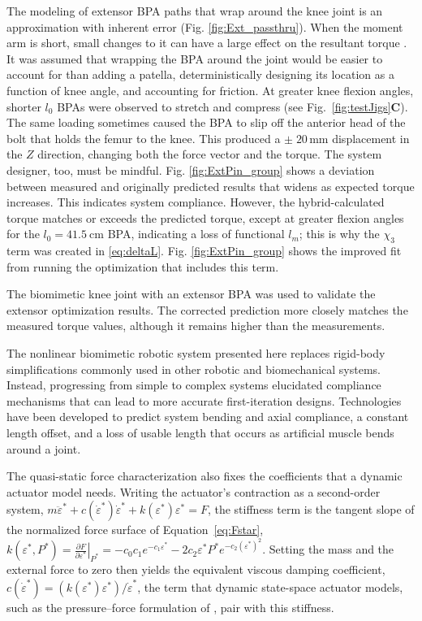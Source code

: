 The modeling of extensor BPA paths that wrap around the knee joint is an approximation with inherent error (Fig. \ref{fig:Ext_passthru}). When the moment arm is short, small changes to it can have a large effect on the resultant torque \citep{young_analyzing_2019}. It was assumed that wrapping the BPA around the joint would be easier to account for than adding a patella, deterministically designing its location as a function of knee angle, and accounting for friction. At greater knee flexion angles, shorter $l_{0}$ BPAs were observed to stretch and compress (see Fig.~\ref{fig:testJigs}\textbf{C}). The same loading sometimes caused the BPA to slip off the anterior head of the bolt that holds the femur to the knee. This produced a $\pm \; 20\,\text{mm}$ displacement in the $Z$ direction, changing both the force vector and the torque. The system designer, too, must be mindful. Fig. \ref{fig:ExtPin_group} shows a deviation between measured and originally predicted results that widens as expected torque increases. This indicates system compliance. However, the hybrid-calculated torque matches or exceeds the predicted torque, except at greater flexion angles for the $l_{0}=\qty{41.5}{\cm}$ BPA, indicating a loss of functional $l_m$; this is why the $\chi_{3}$ term was created in \eqref{eq:deltaL}. Fig. \ref{fig:ExtPin_group} shows the improved fit from running the optimization that includes this term.

The biomimetic knee joint with an extensor BPA was used to validate the extensor optimization results. The corrected prediction more closely matches the measured torque values, although it remains higher than the measurements.


The nonlinear biomimetic robotic system presented here replaces rigid-body simplifications commonly used in other robotic and biomechanical systems. Instead, progressing from simple to complex systems elucidated compliance mechanisms that can lead to more accurate first-iteration designs. Technologies have been developed to predict system bending and axial compliance, a constant length offset, and a loss of usable length that occurs as artificial muscle bends around a joint. 

The quasi-static force characterization also fixes the coefficients that a dynamic actuator model needs. Writing the actuator's contraction as a second-order system, $m\ddot \varepsilon^* + c (\dot \varepsilon^* ) \dot \varepsilon^* + k ( \varepsilon^* ) \varepsilon^* = F$, the stiffness term is the tangent slope of the normalized force surface of Equation~\eqref{eq:Fstar}, $k(\varepsilon^{*}, P^{*})
= \left.\frac{\partial F}{\partial \varepsilon^{*}}\right|_{P^{*}}
= -c_{0}c_{1}e^{-c_{1}\varepsilon^{*}}
  - 2c_{2}\varepsilon^{*}P^{*}e^{-c_{2}(\varepsilon^{*})^{2}}$. Setting the mass and the external force to zero then yields the equivalent viscous damping coefficient, $c (\dot \varepsilon^* ) = (k ( \varepsilon^* ) \varepsilon^*)/\dot \varepsilon^*$, the term that dynamic state-space actuator models, such as the pressure--force formulation of \citet{elzein_pressure_2025}, pair with this stiffness.

